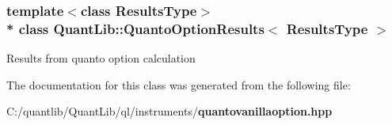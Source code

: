 \subsubsection*{template$<$class Results\+Type$>$\\*
class Quant\+Lib\+::\+Quanto\+Option\+Results$<$ Results\+Type $>$}

Results from quanto option calculation 

The documentation for this class was generated from the following file\+:\begin{DoxyCompactItemize}
\item 
C\+:/quantlib/\+Quant\+Lib/ql/instruments/{\bf quantovanillaoption.\+hpp}\end{DoxyCompactItemize}
